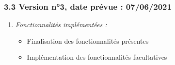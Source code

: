\documentclass[french,a4paper,10pt]{article}
\begin{document}
\subsubsection*{3.3 Version n°3, date prévue : 07/06/2021}
\vspace{0.2cm}
\begin{enumerate}[label=]
\item \textit{Fonctionnalités implémentées :} 
\vspace{0.2cm}
\begin{itemize}
       \item Finalisation des fonctionnalités présentes
       \item Implémentation des fonctionnalités facultatives
   \end{itemize}
\end{enumerate}
\end{document}

